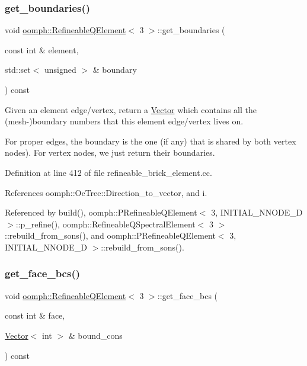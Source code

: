 \subsubsection{\texorpdfstring{get\+\_\+boundaries()}{get\_boundaries()}}
{\footnotesize\ttfamily void \hyperlink{classoomph_1_1RefineableQElement}{oomph\+::\+Refineable\+Q\+Element}$<$ 3 $>$\+::get\+\_\+boundaries (\begin{DoxyParamCaption}\item[{const int \&}]{element,  }\item[{std\+::set$<$ unsigned $>$ \&}]{boundary }\end{DoxyParamCaption}) const\hspace{0.3cm}{\ttfamily [protected]}}

Given an element edge/vertex, return a \hyperlink{classoomph_1_1Vector}{Vector} which contains all the (mesh-\/)boundary numbers that this element edge/vertex lives on.

For proper edges, the boundary is the one (if any) that is shared by both vertex nodes). For vertex nodes, we just return their boundaries. 

Definition at line 412 of file refineable\+\_\+brick\+\_\+element.\+cc.



References oomph\+::\+Oc\+Tree\+::\+Direction\+\_\+to\+\_\+vector, and i.



Referenced by build(), oomph\+::\+P\+Refineable\+Q\+Element$<$ 3, I\+N\+I\+T\+I\+A\+L\+\_\+\+N\+N\+O\+D\+E\+\_\+D $>$\+::p\+\_\+refine(), oomph\+::\+Refineable\+Q\+Spectral\+Element$<$ 3 $>$\+::rebuild\+\_\+from\+\_\+sons(), and oomph\+::\+P\+Refineable\+Q\+Element$<$ 3, I\+N\+I\+T\+I\+A\+L\+\_\+\+N\+N\+O\+D\+E\+\_\+D $>$\+::rebuild\+\_\+from\+\_\+sons().

\mbox{\label{classoomph_1_1RefineableQElement_3_013_01_4_ab7548543df38dcc3a011d51c6ed357ac}} 
\subsubsection{\texorpdfstring{get\+\_\+face\+\_\+bcs()}{get\_face\_bcs()}}
{\footnotesize\ttfamily void \hyperlink{classoomph_1_1RefineableQElement}{oomph\+::\+Refineable\+Q\+Element}$<$ 3 $>$\+::get\+\_\+face\+\_\+bcs (\begin{DoxyParamCaption}\item[{const int \&}]{face,  }\item[{\hyperlink{classoomph_1_1Vector}{Vector}$<$ int $>$ \&}]{bound\+\_\+cons }\end{DoxyParamCaption}) const\hspace{0.3cm}{\ttfamily [protected]}}



